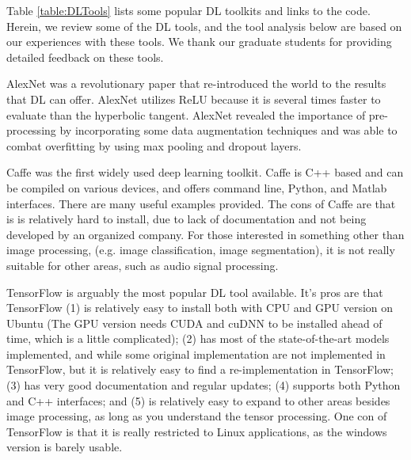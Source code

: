 \documentclass[12pt]{spieman}
\begin{document}
\begin{spacing}{1}
Table \ref{table:DLTools} lists some popular DL toolkits and links to the code. Herein, we review some of the DL tools, and the tool analysis below are based on our experiences with these tools. We thank our graduate students for providing detailed feedback on these tools.

AlexNet \cite{krizhevsky2012imagenet} was a revolutionary paper that re-introduced the world to the results that DL can offer. AlexNet utilizes ReLU because it is several times faster to evaluate than the hyperbolic tangent. AlexNet revealed the importance of pre-processing by incorporating some data augmentation techniques and was able to combat overfitting by using max pooling and dropout layers.

Caffe \cite{Jia2014Caffe} was the first widely used deep learning toolkit. Caffe is C++ based and can be compiled on various devices, and offers command line, Python, and Matlab interfaces. There are many useful examples provided. The cons of Caffe are that is is relatively hard to install, due to lack of documentation and not being developed by an organized company. For those interested in something other than image processing, (e.g. image classification, image segmentation), it is not really suitable for other areas, such as audio signal processing.

TensorFlow \cite{abadi2016tensorflow} is arguably the most popular DL tool available. It's pros are that TensorFlow (1) is relatively easy to install both with CPU and GPU version on Ubuntu (The GPU version needs CUDA and cuDNN to be installed ahead of time, which is a little complicated); (2) has most of the state-of-the-art models implemented, and while some original implementation are not implemented in TensorFlow, but it is relatively easy to find a re-implementation in TensorFlow; (3) has very good documentation and regular updates; (4) supports both Python and C++ interfaces; and (5) is relatively easy to expand to other areas besides image processing, as long as you understand the tensor processing. One con of TensorFlow is that it is really restricted to Linux applications, as the windows version is barely usable.


\end{spacing}
\end{document}
